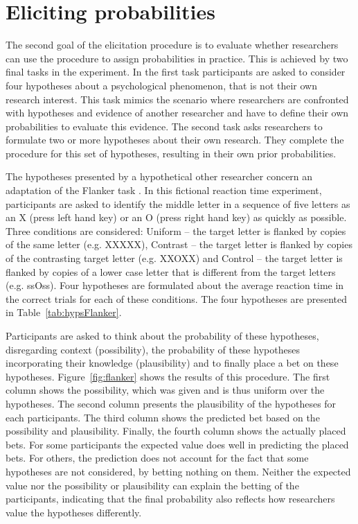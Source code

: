 \documentclass[man]{apa6}
\begin{document}
\section{Eliciting probabilities}
The second goal of the elicitation procedure is to evaluate whether researchers can use the procedure to assign probabilities in practice.
This is achieved by two final tasks in the experiment.
In the first task participants are asked to consider four hypotheses about a psychological phenomenon, that is not their own research interest.
This task mimics the scenario where researchers are confronted with hypotheses and evidence of another researcher and have to define their own probabilities to evaluate this evidence.
The second task asks researchers to formulate two or more hypotheses about their own research.
They complete the procedure for this set of hypotheses, resulting in their own prior probabilities.

The hypotheses presented by a hypothetical other researcher concern an adaptation of the Flanker task \cite{Eriksen1974}.
In this fictional reaction time experiment, participants are asked to identify the middle letter in a sequence of five letters as an X (press left hand key) or an O (press right hand key) as quickly as possible.
Three conditions are considered: Uniform -- the target letter is flanked by copies of the same letter (e.g. XXXXX), Contrast -- the target letter is flanked by copies of the contrasting target letter (e.g. XXOXX) and Control -- the target letter is flanked by copies of a lower case letter that is different from the target letters (e.g. ssOss).
Four hypotheses are formulated about the average reaction time in the correct trials for each of these conditions.
The four hypotheses are presented in Table~\ref{tab:hypsFlanker}.

Participants are asked to think about the probability of these hypotheses, disregarding context (possibility), the probability of these hypotheses incorporating their knowledge (plausibility) and to finally place a bet on these hypotheses.
Figure~\ref{fig:flanker} shows the results of this procedure.
The first column shows the possibility, which was given and is thus uniform over the hypotheses.
The second column presents the plausibility of the hypotheses for each participants.
The third column shows the predicted bet based on the possibility and plausibility.
Finally, the fourth column shows the actually placed bets.
For some participants the expected value does well in predicting the placed bets.
For others, the prediction does not account for the fact that some hypotheses are not considered, by betting nothing on them.
Neither the expected value nor the possibility or plausibility can explain the betting of the participants, indicating that the final probability also reflects how researchers value the hypotheses differently.
\end{document}
